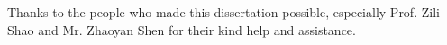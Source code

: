 Thanks to the people who made this dissertation possible, especially Prof. Zili Shao and Mr. Zhaoyan Shen for their kind help and assistance.